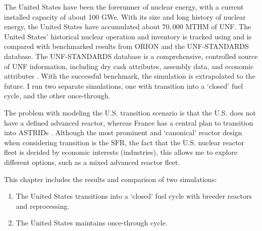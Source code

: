 
The United States have been the forerunner of nuclear energy, with a current
installed capacity of about 100 GWe. With its size and long history of nuclear
energy, the United States have accumulated about $70,000$ \gls{MTHM} of \gls{UNF}.
The United States' historical nuclear operation and inventory is tracked using
\Cyclus and is compared with benchmarked results from \gls{ORION} and the
\gls{UNF-STANDARDS} database. The \gls{UNF-STANDARDS} database is a comprehensive,
controlled source of \gls{UNF} information, including dry cask attributes, assembly
data, and economic attributes \cite{peterson_unf-st&dards_2017}. With the successful benchmark,
the simulation is extrapolated to the future. I run two separate simulations, 
one with transition into a `closed' fuel cycle, and the other once-through.

The problem with modeling the U.S. transition scenario is that the U.S. does not have
a defined advanced reactor, whereas France has a central plan to transition into \glspl{ASTRID} \cite{boullis_french_2015, varaine_pre-conceptual_2012}.
Although the most prominent and `canonical' reactor design when considering
transition is the \gls{SFR}, the fact that the U.S. nuclear reactor fleet
is decided by economic interests (industries), this allows me to explore
different options, such as a mixed advanced reactor fleet. 

This chapter includes the results and comparison of two simulations:
\begin{enumerate}
    \item The United States transitions into a `closed' fuel cycle with breeder reactors and reprocessing.
    \item The United States maintains once-through cycle.
\end{enumerate}
